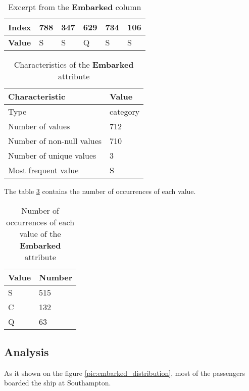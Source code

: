 \begin{table}[!hp]
    \centering
    \caption{Excerpt from the \textbf{Embarked} column}
    \begin{tabular}{|l|l|l|l|l|l|}
        \hline
        \textbf{Index} & 788 & 347 & 629 & 734 & 106 \\ \hline
        \textbf{Value} & S   & S   & Q   & S   & S   \\ \hline
    \end{tabular}
    \label{table:embarked_head}
\end{table}

\begin{table}[!hp]
    \centering
    \caption{Characteristics of the \textbf{Embarked} attribute}
    \begin{tabular}{|l|l|}
        \hline
        \textbf{Characteristic}   & \textbf{Value} \\ \hline
        Type                      & category       \\ \hline
        Number of values          & 712            \\ \hline
        Number of non-null values & 710            \\ \hline
        Number of unique values   & 3              \\ \hline
        Most frequent value       & S              \\ \hline
    \end{tabular}
    \label{table:embarked_characteristics}
\end{table}

The table \ref{table:embarked_value_counts} contains the number of occurrences 
of each value.

\begin{table}[!hp]
    \centering
    \caption{Number of occurrences of each value of the \textbf{Embarked} attribute}
    \begin{tabular}{|l|l|}
        \hline
        \textbf{Value} & \textbf{Number} \\ \hline
        S              & 515             \\ \hline
        C              & 132             \\ \hline
        Q              &  63             \\ \hline
    \end{tabular}
    \label{table:embarked_value_counts}
\end{table}

\subsection{Analysis}
As it shown on the figure \ref{pic:embarked_distribution}, most of the 
passengers boarded the ship at Southampton.

